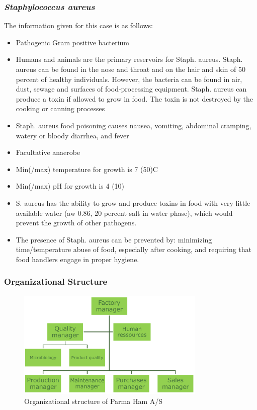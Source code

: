 \subsubsection{\textit{Staphylococcus aureus}}
\begin{highlight}
    The information given for this case is as follows:

\begin{itemize}
\item Pathogenic Gram positive bacterium
\item Humans and animals are the primary reservoirs for Staph. aureus. Staph. aureus can be found in the nose and throat and on the hair and skin of 50 percent of healthy individuals. However, the bacteria can be found in air, dust, sewage and surfaces of food-processing equipment. Staph. aureus can produce a toxin if allowed to grow in food. The toxin is not destroyed by the cooking or canning processes
\item Staph. aureus food poisoning causes nausea, vomiting,
abdominal cramping, watery or bloody diarrhea, and fever
\item Facultative anaerobe
\item Min(/max) temperature for growth is 7 (50)\textdegree C
\item Min(/max) pH for growth is 4 (10)
\item S. aureus has the ability to grow and produce toxins in food with very little available water (aw 0.86, 20 percent salt in water phase), which would prevent the growth of other pathogens.
\item The presence of Staph. aureus can be prevented by:
minimizing time/temperature abuse of food, especially after
cooking, and requiring that food handlers engage in proper
hygiene.

\end{itemize}
\end{highlight}

\newpage

\subsubsection*{Organizational Structure}
\begin{figure}[h]
    \centering
    \includegraphics[width=0.8\textwidth]{Figures/Parma Ham - Organization Diagram.png}
    \caption{Organizational structure of Parma Ham A/S}
    \label{fig:ParmaHamAS}
\end{figure}

